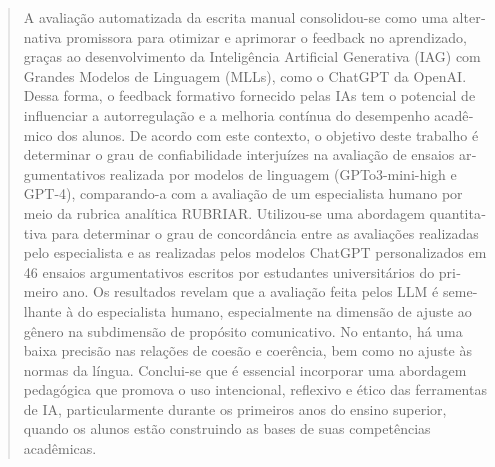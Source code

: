 \documentclass[spanish]{textolivre}
\begin{document}
\begin{polyabstract}
\begin{portuguese}
\begin{abstract}
A avaliação automatizada da escrita manual consolidou-se como uma alternativa promissora para otimizar e aprimorar o feedback no aprendizado, graças ao desenvolvimento da Inteligência Artificial Generativa (IAG) com Grandes Modelos de Linguagem (MLLs), como o ChatGPT da OpenAI. Dessa forma, o feedback formativo fornecido pelas IAs tem o potencial de influenciar a autorregulação e a melhoria contínua do desempenho acadêmico dos alunos. De acordo com este contexto, o objetivo deste trabalho é determinar o grau de confiabilidade interjuízes na avaliação de ensaios argumentativos realizada por modelos de linguagem (GPTo3-mini-high e GPT-4), comparando-a com a avaliação de um especialista humano por meio da rubrica analítica RUBRIAR. Utilizou-se uma abordagem quantitativa para determinar o grau de concordância entre as avaliações realizadas pelo especialista e as realizadas pelos modelos ChatGPT personalizados em 46 ensaios argumentativos escritos por estudantes universitários do primeiro ano. Os resultados revelam que a avaliação feita pelos LLM é semelhante à do especialista humano, especialmente na dimensão de ajuste ao gênero na subdimensão de propósito comunicativo. No entanto, há uma baixa precisão nas relações de coesão e coerência, bem como no ajuste às normas da língua. Conclui-se que é essencial incorporar uma abordagem pedagógica que promova o uso intencional, reflexivo e ético das ferramentas de IA, particularmente durante os primeiros anos do ensino superior, quando os alunos estão construindo as bases de suas competências acadêmicas.

\end{abstract}
\end{portuguese}


\end{polyabstract}
\end{document}
